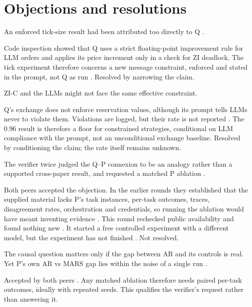 \documentclass{article}
\begin{document}
\section{Objections and resolutions}

\begin{objection}
An enforced tick-size result had been attributed too directly to Q .
\end{objection}
Code inspection showed that Q uses a strict floating-point improvement rule for LLM orders and applies its price increment only in a check for ZI deadlock. The tick experiment therefore concerns a new message constraint, enforced and stated in the prompt, not Q as run . Resolved by narrowing the claim.

\begin{objection}
ZI-C and the LLMs might not face the same effective constraint.
\end{objection}
Q's exchange does not enforce reservation values, although its prompt tells LLMs never to violate them. Violations are logged, but their rate is not reported . The \(0.96\) result is therefore a floor for constrained strategies, conditional on LLM compliance with the prompt, not an unconditional exchange baseline. Resolved by conditioning the claim; the rate itself remains unknown.

\begin{objection}
The verifier twice judged the Q--P connexion to be an analogy rather than a supported cross-paper result, and requested a matched P ablation .
\end{objection}
Both peers accepted the objection. In the earlier rounds they established that the supplied material lacks P's task instances, per-task outcomes, traces, disagreement rates, orchestration and credentials, so running the ablation would have meant inventing evidence . This round rechecked public availability and found nothing new . It started a free controlled experiment with a different model, but the experiment has not finished . Not resolved.

\begin{objection}
The causal question matters only if the gap between AR and its controls is real. Yet P's own AR vs MARS gap lies within the noise of a single run .
\end{objection}
Accepted by both peers . Any matched ablation therefore needs paired per-task outcomes, ideally with repeated seeds. This qualifies the verifier's request rather than answering it.
\end{document}

